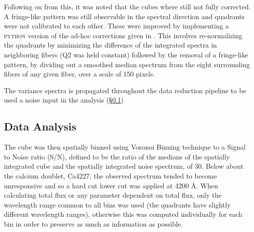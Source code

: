 \documentclass[fleqn,usenatbib,useAMS]{mnras}
\begin{document}

		Following on from this, it was noted that the cubes where still not fully corrected. A fringe-like pattern was still observable in the spectral direction and quadrants were not calibrated to each other. These were improved by implementing a \textsc{python} version of the ad-hoc corrections given in \citet{Lagerholm2012}. This involves re-normalizing the quadrants by minimizing the difference of the integrated spectra in neighboring fibers (Q2 was held constant) followed by the removal of a fringe-like pattern, by dividing out a smoothed median spectrum from the eight surrounding fibers of any given fiber, over a scale of 150 pixels. 

		The variance spectra is propagated throughout the data reduction pipeline to be used a noise input in the analysis (\S \ref{subsec:analysis})

	\subsection{Data Analysis}
		\label{subsec:analysis}
		The cube was then spatially binned using Voronoi Binning technique \citep{Cappellari2003} to a Signal to Noise ratio (S/N), defined to be the ratio of the medians of the spatially integrated cube and the spatially integrated noise spectrum, of 30. Below about the calcium doublet, Ca4227, the observed spectrum tended to become unresponsive and so a hard cut lower cut was applied at 4200 \AA. When calculating total flux or any parameter dependent on total flux, only the wavelength range common to all bins was used (the quadrants have slightly different wavelength ranges), otherwise this was computed individually for each bin in order to preserve as much as information as possible.
\end{document}
